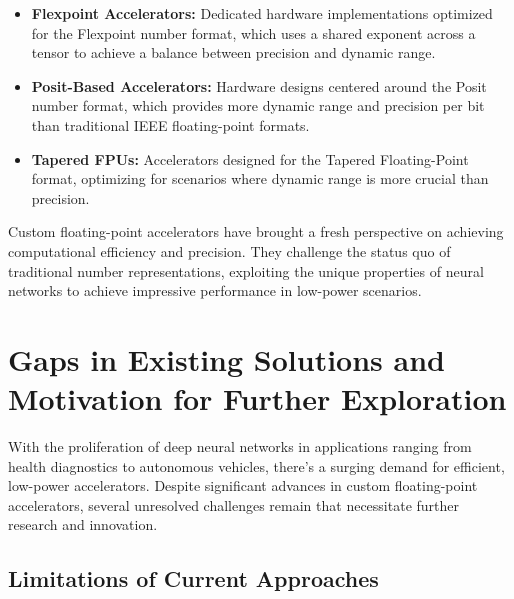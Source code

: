 \begin{itemize}
	\item \textbf{Flexpoint Accelerators:} Dedicated hardware implementations optimized for the Flexpoint number format, which uses a shared exponent across a tensor to achieve a balance between precision and dynamic range.
	
	\item \textbf{Posit-Based Accelerators:} Hardware designs centered around the Posit number format, which provides more dynamic range and precision per bit than traditional IEEE floating-point formats.
	
	\item \textbf{Tapered FPUs:} Accelerators designed for the Tapered Floating-Point format, optimizing for scenarios where dynamic range is more crucial than precision.
\end{itemize}


Custom floating-point accelerators have brought a fresh perspective on achieving computational efficiency and precision. They challenge the status quo of traditional number representations, exploiting the unique properties of neural networks to achieve impressive performance in low-power scenarios.

\section{Gaps in Existing Solutions and Motivation for Further Exploration}

With the proliferation of deep neural networks in applications ranging from health diagnostics to autonomous vehicles, there's a surging demand for efficient, low-power accelerators. Despite significant advances in custom floating-point accelerators, several unresolved challenges remain that necessitate further research and innovation.

\subsection{Limitations of Current Approaches}


